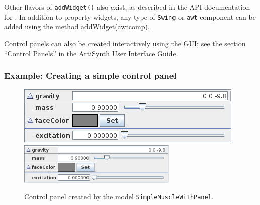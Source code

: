 Other flavors of {\tt addWidget()} also exist, as described in the API
documentation for .  In
addition to property widgets, any type of {\tt Swing} or {\tt awt}
component can be added using the method
%
{addWidget(awtcomp)}.

Control panels can also be created interactively using the GUI; see
the section ``Control Panels'' in the
\href{../uiguide/uiguide.html}{
ArtiSynth User Interface Guide}.

\subsubsection{Example: Creating a simple control panel}

\begin{figure}[t]
\begin{center}
\iflatexml
 \includegraphics[]{images/controlPanel}
\else
 \includegraphics[width=3in]{images/controlPanel}
\fi
\end{center}
\caption{Control panel created by the model {\tt SimpleMuscleWithPanel}.}
\label{controlPanel:fig}
\end{figure}

